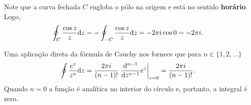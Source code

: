 \begin{questions}
\begin{solution}
    Note que a curva fechada $C$ engloba o pólo na origem e está no sentido \textbf{horário}. Logo, \vspace{-5mm}
    \begin{align*}
        \oint_{C} \frac{\cos z}{z} \mathrm{d} z
            = -\oint_{-C} \frac{\cos z}{z} \mathrm{d} z
            = -2\pi i \cos 0
            = -2\pi i.
    \end{align*}
\end{solution}

\setcounter{question}{15}
\begin{solution}
    Uma aplicação direta da fórmula de Cauchy nos fornece que para $n \in \{1,2,\dots\}$
    \[ \oint \frac{e^z}{z^n} \mathrm{d} z
        = \frac{2\pi i}{(n-1)!} \left. \frac{\mathrm{d}^{n-1}}{\mathrm{d} z^{n-1}} e^z \right|_{z=0}
        = \frac{2\pi i}{(n-1)!}.\]
    Quando $n = 0$ a função é analítica no interior do círculo e, portanto, a integral é zero.
\end{solution}

\end{questions}

